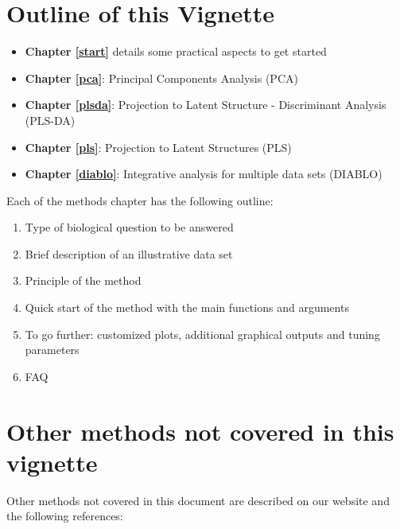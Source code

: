 \documentclass[]{book}
\providecommand{\tightlist}{%
  \setlength{\itemsep}{0pt}\setlength{\parskip}{0pt}}
\theoremstyle{definition}
\theoremstyle{definition}
\theoremstyle{definition}
\theoremstyle{remark}
\begin{document}
\section{Outline of this Vignette}\label{outline-of-this-vignette}

\begin{itemize}
\tightlist
\item
  \textbf{Chapter \ref{start}} details some practical aspects to get
  started
\item
  \textbf{Chapter \ref{pca}}: Principal Components Analysis (PCA)
\item
  \textbf{Chapter \ref{plsda}}: Projection to Latent Structure -
  Discriminant Analysis (PLS-DA)
\item
  \textbf{Chapter \ref{pls}}: Projection to Latent Structures (PLS)
\item
  \textbf{Chapter \ref{diablo}}: Integrative analysis for multiple data
  sets (DIABLO)
\end{itemize}

Each of the methods chapter has the following outline:

\begin{enumerate}
\def\labelenumi{\arabic{enumi}.}
\tightlist
\item
  Type of biological question to be answered
\item
  Brief description of an illustrative data set
\item
  Principle of the method
\item
  Quick start of the method with the main functions and arguments
\item
  To go further: customized plots, additional graphical outputs and
  tuning parameters
\item
  FAQ
\end{enumerate}

\section{Other methods not covered in this
vignette}\label{other-methods-not-covered-in-this-vignette}

Other methods not covered in this document are described on our website
and the following references:
\end{document}

